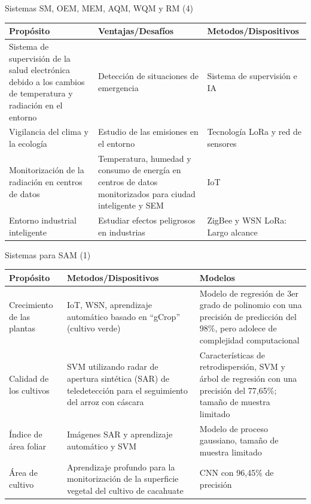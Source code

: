 \documentclass[aspectratio=169,compress]{beamer}
\begin{document}
\begin{frame}{Sistemas SM, OEM, MEM, AQM, WQM y RM (4)}
\begin{center}
\footnotesize
\begin{tabular}{p{4.5cm}|p{4.5cm}|p{4.5cm}}
\hline
\textbf{Propósito} & \textbf{Ventajas/Desafíos} & \textbf{Metodos/Dispositivos} \\
\hline

Sistema de supervisión de la salud electrónica debido a los cambios de temperatura y radiación en el entorno &
Detección de situaciones de emergencia &
Sistema de supervisión e IA \\  \hline

Vigilancia del clima y la ecología &
Estudio de las emisiones en el entorno &
Tecnología LoRa y red de sensores \\  \hline

Monitorización de la radiación en centros de datos &
Temperatura, humedad y consumo de energía en centros de datos monitorizados para ciudad inteligente y SEM &
IoT \\  \hline

Entorno industrial inteligente &
Estudiar efectos peligrosos en industrias &
ZigBee y WSN LoRa: Largo alcance \\  \hline


\end{tabular}
\end{center}

\end{frame}


\begin{frame}{Sistemas para SAM (1)}
\begin{center}
\footnotesize
\begin{tabular}{p{4.5cm}|p{4.5cm}|p{4.5cm}}
\hline
\textbf{Propósito} & \textbf{Metodos/Dispositivos} & \textbf{Modelos} \\
\hline

Crecimiento de las plantas &
IoT, WSN, aprendizaje automático basado en ``gCrop'' (cultivo verde) &
Modelo de regresión de 3er grado de polinomio con una precisión de predicción del 98\%, pero adolece de complejidad computacional \\  \hline

Calidad de los cultivos &
SVM utilizando radar de apertura sintética (SAR) de teledetección para el seguimiento del arroz con cáscara &
Características de retrodispersión, SVM y árbol de regresión con una precisión del 77,65\%; tamaño de muestra limitado \\  \hline

Índice de área foliar &
Imágenes SAR y aprendizaje automático y SVM &
Modelo de proceso gaussiano, tamaño de muestra limitado \\  \hline

Área de cultivo &
Aprendizaje profundo para la monitorización de la superficie vegetal del cultivo de cacahuate &
CNN con 96,45\% de precisión\\  \hline

\end{tabular}
\end{center}

\end{frame}
\end{document}
